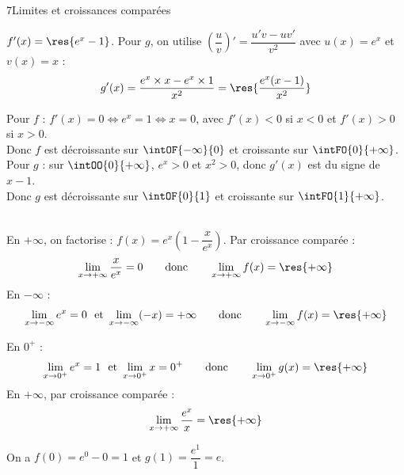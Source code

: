 \begin{corrige}{7}{Limites et croissances comparées}
\begin{questions}
  \item $f'(x)=\res{e^{x}-1}$.\enspace
    Pour $g$, on utilise $\left(\dfrac{u}{v}\right)'=\dfrac{u'v-uv'}{v^{2}}$ avec $u(x)=e^{x}$ et $v(x)=x$ :
    \[ g'(x)=\frac{e^{x}\times x-e^{x}\times1}{x^{2}}=\res{\frac{e^{x}(x-1)}{x^{2}}} \]
  \item Pour $f$ : $f'(x)=0\iff e^{x}=1\iff x=0$, avec $f'(x)<0$ si $x<0$ et $f'(x)>0$ si $x>0$.\\
    Donc $f$ est décroissante sur $\intOF{-\infty}{0}$ et croissante sur $\intFO{0}{+\infty}$.\\[1mm]
    Pour $g$ : sur $\intOO{0}{+\infty}$, $e^{x}>0$ et $x^{2}>0$, donc $g'(x)$ est du signe de $x-1$.\\
    Donc $g$ est décroissante sur $\intOF{0}{1}$ et croissante sur $\intFO{1}{+\infty}$.
  \item {}\\
    En $+\infty$, on factorise : $f(x)=e^{x}\left(1-\dfrac{x}{e^{x}}\right)$. Par croissance comparée :
    \[ \lim_{x\to+\infty}\frac{x}{e^{x}}=0 \qquad\text{donc}\qquad \lim_{x\to+\infty}f(x)=\res{+\infty} \]
    En $-\infty$ :
    \[ \lim_{x\to-\infty}e^{x}=0 \ \text{ et } \lim_{x\to-\infty}(-x)=+\infty
       \qquad\text{donc}\qquad \lim_{x\to-\infty}f(x)=\res{+\infty} \]
  \item En $0^{+}$ :
    \[ \lim_{x\to0^{+}}e^{x}=1 \ \text{ et } \lim_{x\to0^{+}}x=0^{+}
       \qquad\text{donc}\qquad \lim_{x\to0^{+}}g(x)=\res{+\infty} \]
    En $+\infty$, par croissance comparée :
    \[ \lim_{x\to+\infty}\frac{e^{x}}{x}=\res{+\infty} \]
  \item On a $f(0)=e^{0}-0=1$ et $g(1)=\dfrac{e^{1}}{1}=e$.\par\vspace{2mm}
    \noindent
    \begin{minipage}[t]{0.49\linewidth}\centering
      \begin{tableau}
      \end{tableau}
    \end{minipage}\hfill
    \begin{minipage}[t]{0.49\linewidth}\centering
      \begin{tableau}
      \end{tableau}
    \end{minipage}
\end{questions}
\end{corrige}

